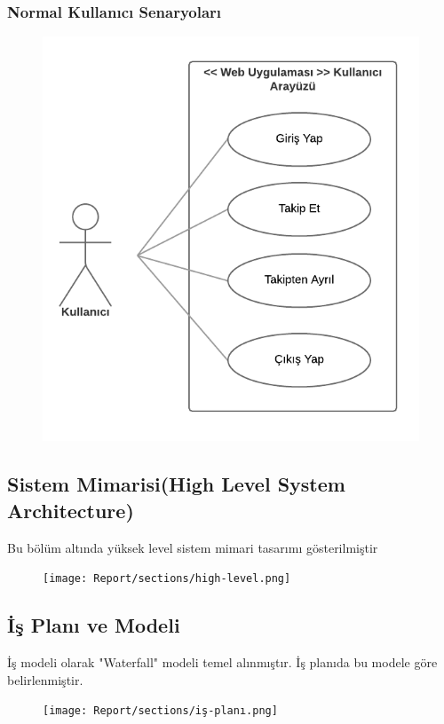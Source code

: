 \subsubsection{Normal Kullanıcı Senaryoları}
\begin{figure}[h!]
    \centering
    \includegraphics{Report/images/use5.png}
    \label{fig:use5}
\end{figure}
\newpage
\subsection{Sistem Mimarisi(High Level System Architecture)}
Bu bölüm altında yüksek level sistem mimari tasarımı gösterilmiştir
\begin{figure}[h!]
    \centering
    \texttt{[image: Report/sections/high-level.png]}
    \label{fig:use5}
\end{figure}
\newpage
\subsection{İş Planı ve Modeli}
İş modeli olarak "Waterfall" modeli temel alınmıştır. İş planıda bu modele göre belirlenmiştir.
\begin{figure}[h!]
    \centering
    \texttt{[image: Report/sections/iş-planı.png]}
    \label{fig:plan}
\end{figure}

